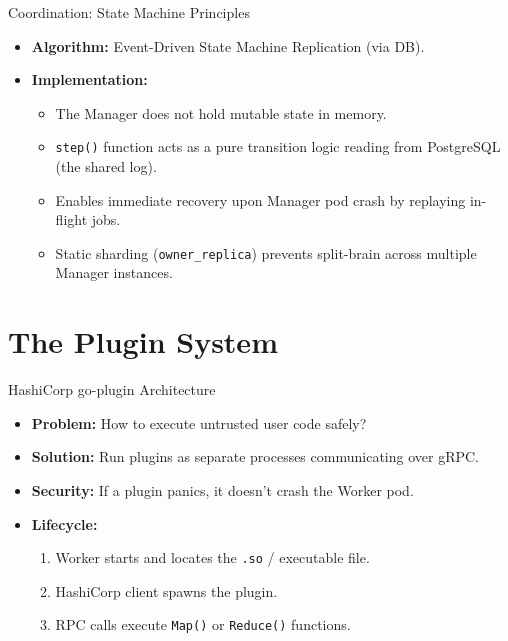 \documentclass[10pt,aspectratio=169]{beamer}
\begin{document}
\begin{frame}{Coordination: State Machine Principles}
    \begin{itemize}
        \item \textbf{Algorithm:} Event-Driven State Machine Replication (via DB).
        \item \textbf{Implementation:}
            \begin{itemize}
                \item The Manager does not hold mutable state in memory.
                \item \texttt{step()} function acts as a pure transition logic reading from PostgreSQL (the shared log).
                \item Enables immediate recovery upon Manager pod crash by replaying in-flight jobs.
                \item Static sharding (\texttt{owner\_replica}) prevents split-brain across multiple Manager instances.
            \end{itemize}
    \end{itemize}
\end{frame}

\section{The Plugin System}

\begin{frame}{HashiCorp go-plugin Architecture}
    \begin{itemize}
        \item \textbf{Problem:} How to execute untrusted user code safely?
        \item \textbf{Solution:} Run plugins as separate processes communicating over gRPC.
        \item \textbf{Security:} If a plugin panics, it doesn't crash the Worker pod.
        \item \textbf{Lifecycle:}
            \begin{enumerate}
                \item Worker starts and locates the \texttt{.so} / executable file.
                \item HashiCorp client spawns the plugin.
                \item RPC calls execute \texttt{Map()} or \texttt{Reduce()} functions.
            \end{enumerate}
    \end{itemize}
\end{frame}
\end{document}
